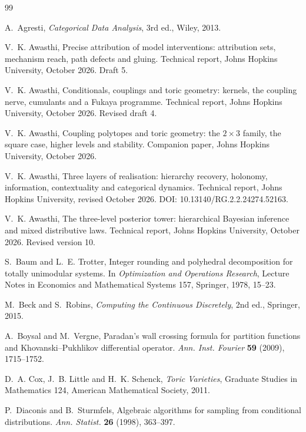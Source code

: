 \documentclass[11pt]{article}
\theoremstyle{definition}
\theoremstyle{remark}
\begin{document}
\begin{thebibliography}{99}

A.~Agresti, \emph{Categorical Data Analysis}, 3rd ed., Wiley, 2013.

V.~K. Awasthi, Precise attribution of model interventions: attribution sets, mechanism reach, path defects and gluing.
Technical report, Johns Hopkins University, October 2026. Draft 5.

V.~K. Awasthi, Conditionals, couplings and toric geometry: kernels, the coupling nerve, cumulants and a {F}ukaya
programme. Technical report, Johns Hopkins University, October 2026. Revised draft 4.

V.~K. Awasthi, Coupling polytopes and toric geometry: the $2\times3$ family, the square case, higher levels and stability.
Companion paper, Johns Hopkins University, October 2026.

V.~K. Awasthi, Three layers of realisation: hierarchy recovery, holonomy, information, contextuality and categorical
dynamics. Technical report, Johns Hopkins University, revised October 2026. DOI: 10.13140/RG.2.2.24274.52163.

V.~K. Awasthi, The three-level posterior tower: hierarchical {B}ayesian inference and mixed distributive laws.
Technical report, Johns Hopkins University, October 2026. Revised version 10.

S.~Baum and L.~E. Trotter, Integer rounding and polyhedral decomposition for totally unimodular systems. In
\emph{Optimization and Operations Research}, Lecture Notes in Economics and Mathematical Systems 157, Springer, 1978,
15--23.

M.~Beck and S.~Robins, \emph{Computing the Continuous Discretely}, 2nd ed., Springer, 2015.

A.~Boysal and M.~Vergne, Paradan's wall crossing formula for partition functions and Khovanski--Pukhlikov differential
operator. \emph{Ann. Inst. Fourier} \textbf{59} (2009), 1715--1752.

D.~A. Cox, J.~B. Little and H.~K. Schenck, \emph{Toric Varieties}, Graduate Studies in Mathematics 124, American
Mathematical Society, 2011.

P.~Diaconis and B.~Sturmfels, Algebraic algorithms for sampling from conditional distributions. \emph{Ann. Statist.}
\textbf{26} (1998), 363--397.


\end{thebibliography}
\end{document}
